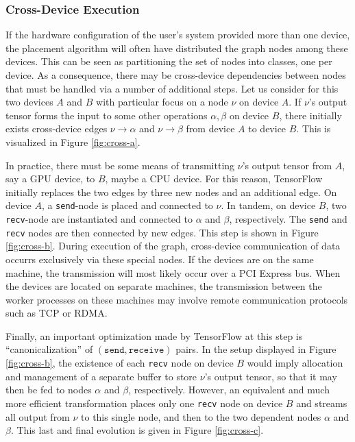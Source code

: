 \subsubsection{Cross-Device Execution}\label{sec:model-exec-single}

If the hardware configuration of the user's system provided more than one
device, the placement algorithm will often have distributed the graph nodes
among these devices. This can be seen as partitioning the set of nodes into
classes, one per device. As a consequence, there may be cross-device
dependencies between nodes that must be handled via a number of additional
steps. Let us consider for this two devices $A$ and $B$ with particular focus on
a node $\nu$ on device $A$. If $\nu$'s output tensor forms the input to some
other operations $\alpha, \beta$ on device $B$, there initially exists
cross-device edges $\nu \rightarrow \alpha$ and $\nu \rightarrow \beta$ from
device $A$ to device $B$. This is visualized in Figure \ref{fig:cross-a}.

In practice, there must be some means of transmitting $\nu$'s output tensor from
$A$, say a GPU device, to $B$, maybe a CPU device. For this reason, TensorFlow
initially replaces the two edges by three new nodes and an additional edge. On
device $A$, a \texttt{send}-node is placed and connected to $\nu$. In tandem, on
device $B$, two \texttt{recv}-node are instantiated and connected to $\alpha$
and $\beta$, respectively. The \texttt{send} and \texttt{recv} nodes are then
connected by new edges. This step is shown in Figure \ref{fig:cross-b}. During
execution of the graph, cross-device communication of data occurrs exclusively
via these special nodes. If the devices are on the same machine, the
transmission will most likely occur over a PCI Express bus. When the devices are
located on separate machines, the transmission between the worker processes on
these machines may involve remote communication protocols such as TCP or RDMA.

Finally, an important optimization made by TensorFlow at this step is
``canonicalization'' of $(\mathtt{send}, \mathtt{receive})$ pairs. In the setup
displayed in Figure \ref{fig:cross-b}, the existence of each \texttt{recv} node
on device $B$ would imply allocation and management of a separate buffer to
store $\nu$'s output tensor, so that it may then be fed to nodes $\alpha$ and
$\beta$, respectively. However, an equivalent and much more efficient
transformation places only one \texttt{recv} node on device $B$ and streams all
output from $\nu$ to this single node, and then to the two dependent nodes
$\alpha$ and $\beta$. This last and final evolution is given in Figure
\ref{fig:cross-c}.

